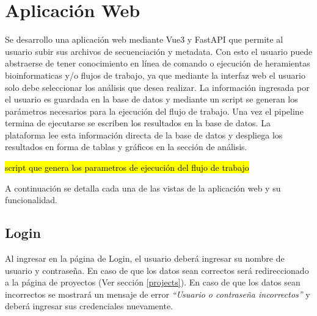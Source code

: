 
\newpage
\section{Aplicación Web}
Se desarrollo una aplicación web mediante Vue3 y FastAPI que permite al usuario subir sus archivos de secuenciación y metadata. 
Con esto el usuario puede abstraerse de tener conocimiento en línea de comando o ejecución de heramientas bioinformaticas y/o flujos de trabajo, 
ya que mediante la interfaz web el usuario solo debe seleccionar los análisis que desea realizar.
La información ingresada por el usuario es guardada en la base de datos y mediante un script se generan los parámetros necesarios para la ejecución del flujo de trabajo.
Una vez el pipeline termina de ejecutarse se escriben los resultados en la base de datos. 
La plataforma lee esta información directa de la base de datos y despliega los resultados en forma de tablas y gráficos en la sección de análisis.

\hl{script que genera los parametros de ejecución del flujo de trabajo} 

A continuación se detalla cada una de las vistas de la aplicación web y su funcionalidad.

\subsection{Login}
Al ingresar en la página de Login, el usuario deberá ingresar su nombre de usuario y contraseña.
En caso de que los datos sean correctos será redireccionado a la página de proyectos (Ver sección \ref{projects}).
En caso de que los datos sean incorrectos se mostrará un mensaje de error \textit{“Usuario o contraseña incorrectos”} y deberá ingresar sus credenciales nuevamente.



